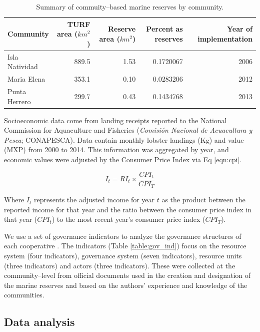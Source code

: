 \documentclass{frontiersSCNS}
\theoremstyle{definition}
\theoremstyle{definition}
\theoremstyle{definition}
\theoremstyle{remark}
\begin{document}
\begin{table}

\caption{\label{tab:unnamed-chunk-2}\label{table:com_sum} Summary of commuity--based marine reserves by community.}
\centering
\begin{tabular}[t]{l|r|r|r|r}
\hline
Community & TURF area ($km^2$) & Reserve area ($km^2$) & Percent as reserves & Year of implementation\\
\hline
Isla Natividad & 889.5 & 1.53 & 0.1720067 & 2006\\
\hline
Maria Elena & 353.1 & 0.10 & 0.0283206 & 2012\\
\hline
Punta Herrero & 299.7 & 0.43 & 0.1434768 & 2013\\
\hline
\end{tabular}
\end{table}

Socioeconomic data come from landing receipts reported to the National
Commission for Aquaculture and Fisheries (\emph{Comisión Nacional de
Acuacultura y Pesca}; CONAPESCA). Data contain monthly lobster landings
(Kg) and value (MXP) from 2000 to 2014. This information was aggregated
by year, and economic values were adjusted by the Consumer Price Index
\citep{oecd_2017-VV} via Eq \ref{eqn:cpi}.

\begin{equation}
I_t = RI_t\times\frac{CPI_t}{CPI_T}
\label{eqn:cpi}
\end{equation}

Where \(I_t\) represents the adjusted income for year \(t\) as the
product between the reported income for that year and the ratio between
the consumer price index in that year (\(CPI_t\)) to the most recent
year's consumer price index (\(CPI_T\)).

We use a set of governance indicators to analyze the governance
structures of each cooperative \citep{leslie_2015-na}. The indicators
(Table \ref{table:gov_ind}) focus on the resource system (four
indicators), governance system (seven indicators), resource units (three
indicators) and actors (three indicators). These were collected at the
community--level from official documents used in the creation and
designation of the marine reserves
\citep{dof_website_2012,dof_website_2012} and based on the authors'
experience and knowledge of the communities.

\subsection{Data analysis}\label{data-analysis}
\end{document}
